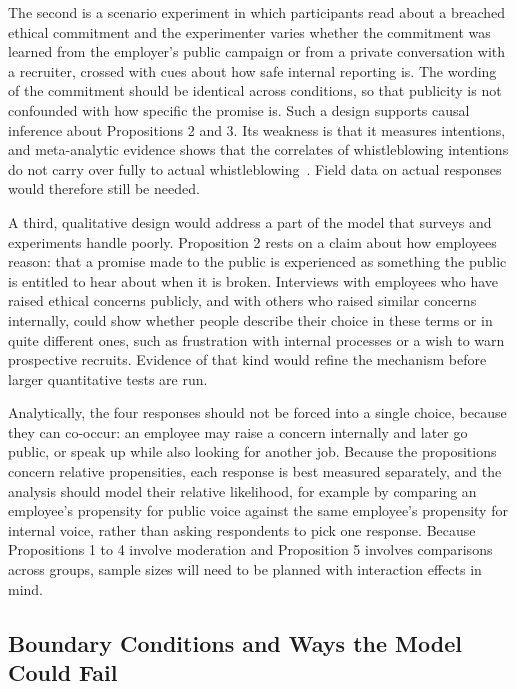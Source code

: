 \documentclass[12pt,a4paper]{article}
\theoremstyle{definition}
\begin{document}
The second is a scenario experiment in which participants read about a breached ethical commitment and the experimenter varies whether the commitment was learned from the employer's public campaign or from a private conversation with a recruiter, crossed with cues about how safe internal reporting is. The wording of the commitment should be identical across conditions, so that publicity is not confounded with how specific the promise is. Such a design supports causal inference about Propositions 2 and 3. Its weakness is that it measures intentions, and meta-analytic evidence shows that the correlates of whistleblowing intentions do not carry over fully to actual whistleblowing~\citep{mesmermagnus2005whistleblowing}. Field data on actual responses would therefore still be needed.

A third, qualitative design would address a part of the model that surveys and experiments handle poorly. Proposition 2 rests on a claim about how employees reason: that a promise made to the public is experienced as something the public is entitled to hear about when it is broken. Interviews with employees who have raised ethical concerns publicly, and with others who raised similar concerns internally, could show whether people describe their choice in these terms or in quite different ones, such as frustration with internal processes or a wish to warn prospective recruits. Evidence of that kind would refine the mechanism before larger quantitative tests are run.

Analytically, the four responses should not be forced into a single choice, because they can co-occur: an employee may raise a concern internally and later go public, or speak up while also looking for another job. Because the propositions concern relative propensities, each response is best measured separately, and the analysis should model their relative likelihood, for example by comparing an employee's propensity for public voice against the same employee's propensity for internal voice, rather than asking respondents to pick one response. Because Propositions 1 to 4 involve moderation and Proposition 5 involves comparisons across groups, sample sizes will need to be planned with interaction effects in mind.

\subsection{Boundary Conditions and Ways the Model Could Fail}
\end{document}
